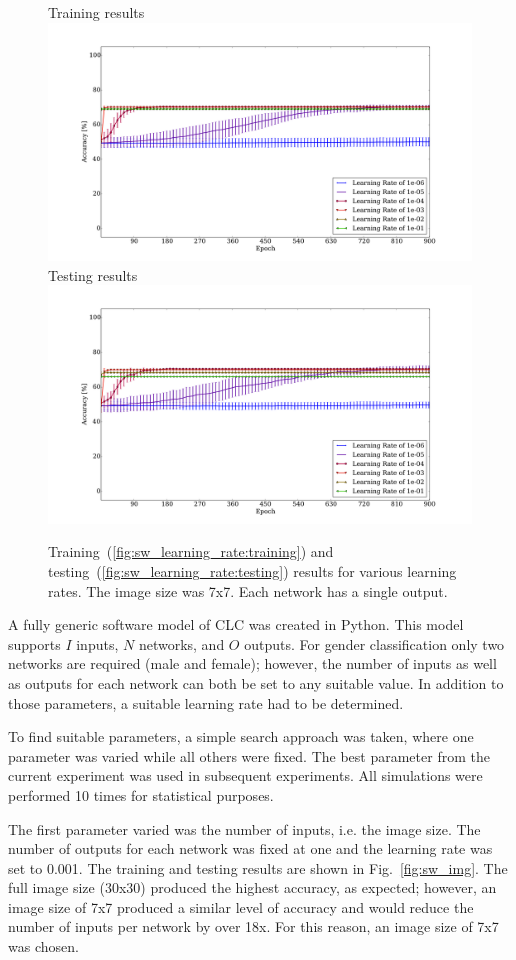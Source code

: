 \documentclass[10pt,journal]{IEEEtran}
\newcommand{\fig}[1]{Fig.~\ref{#1}}
\newcommand{\subfig}[1]{~(\ref{#1})}
\begin{document}
				\begin{figure}[t!]
					\captionsetup[subfigure]{position=b}
					\centering
					\hfill
					\subcaptionbox
					{
						Training results
						\label{fig:sw_learning_rate:training}
					}
					{\includegraphics[width=0.49\linewidth]{sw_learning_rate_training}}
					\hfill
					\subcaptionbox
					{
						Testing results
						\label{fig:sw_learning_rate:testing}
					}
					{\includegraphics[width=0.49\linewidth]{sw_learning_rate_testing}}
					\hfill
					\caption{Training\subfig{fig:sw_learning_rate:training} and testing\subfig{fig:sw_learning_rate:testing} results for various learning rates. The image size was 7x7. Each network has a single output.}
					\label{fig:sw_learning_rate}
				\end{figure}
				
				A fully generic software model of CLC was created in Python. This model supports \(I\) inputs, \(N\) networks, and \(O\) outputs. For gender classification only two networks are required (male and female); however, the number of inputs as well as outputs for each network can both be set to any suitable value. In addition to those parameters, a suitable learning rate had to be determined.
				
				To find suitable parameters, a simple search approach was taken, where one parameter was varied while all others were fixed. The best parameter from the current experiment was used in subsequent experiments. All simulations were performed 10 times for statistical purposes.
				
				The first parameter varied was the number of inputs, i.e. the image size. The number of outputs for each network was fixed at one and the learning rate was set to 0.001. The training and testing results are shown in \fig{fig:sw_img}. The full image size (30x30) produced the highest accuracy, as expected; however, an image size of 7x7 produced a similar level of accuracy and would reduce the number of inputs per network by over 18x. For this reason, an image size of 7x7 was chosen.
				
\end{document}
